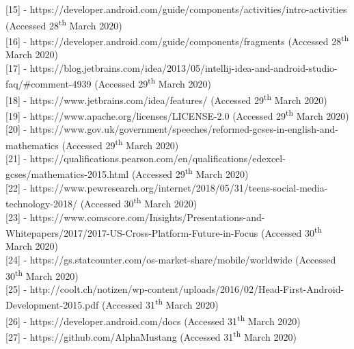 \documentclass{article}
\begin{document}
[15] - https://developer.android.com/guide/components/activities/intro-activities (Accessed 28\textsuperscript{th} March 2020) \\

[16] - https://developer.android.com/guide/components/fragments (Accessed 28\textsuperscript{th} March 2020) \\

[17] - https://blog.jetbrains.com/idea/2013/05/intellij-idea-and-android-studio-faq/\#comment-4939 (Accessed 29\textsuperscript{th} March 2020) \\

[18] - https://www.jetbrains.com/idea/features/ (Accessed 29\textsuperscript{th} March 2020) \\ 

[19] - https://www.apache.org/licenses/LICENSE-2.0 (Accessed 29\textsuperscript{th} March 2020) \\

[20] - https://www.gov.uk/government/speeches/reformed-gcses-in-english-and-mathematics (Accessed 29\textsuperscript{th} March 2020) \\

[21] - https://qualifications.pearson.com/en/qualifications/edexcel-gcses/mathematics-2015.html (Accessed 29\textsuperscript{th} March 2020) \\

[22] - https://www.pewresearch.org/internet/2018/05/31/teens-social-media-technology-2018/ (Accessed 30\textsuperscript{th} March 2020) \\

[23] - https://www.comscore.com/Insights/Presentations-and-Whitepapers/2017/2017-US-Cross-Platform-Future-in-Focus (Accessed 30\textsuperscript{th} March 2020) \\

[24] - https://gs.statcounter.com/os-market-share/mobile/worldwide (Accessed 30\textsuperscript{th} March 2020) \\

[25] - http://coolt.ch/notizen/wp-content/uploads/2016/02/Head-First-Android-Development-2015.pdf (Accessed 31\textsuperscript{th} March 2020) \\

[26] - https://developer.android.com/docs (Accessed 31\textsuperscript{th} March 2020) \\

[27] - https://github.com/AlphaMustang (Accessed 31\textsuperscript{th} March 2020)
\end{document}
